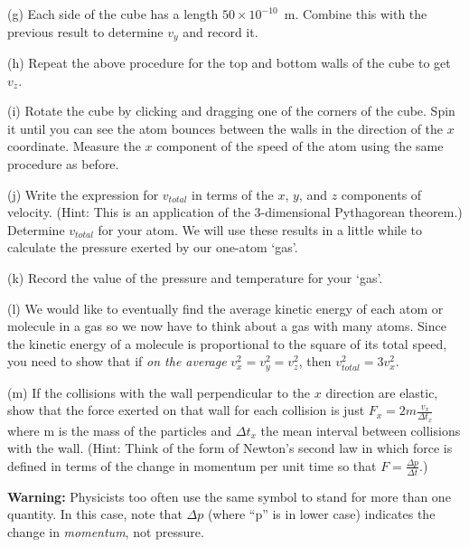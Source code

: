 (g) Each side of the cube has a length $50 \times 10^{-10}$~m.
Combine this with the previous result to determine $v_y$ and record it.
\vspace{20mm}

(h) Repeat the above procedure for the top and bottom walls of the cube to get $v_z$.
\vspace{20mm}

(i) Rotate the cube by clicking and dragging one of the corners of the cube.
Spin it until you can see the atom bounces between the walls in the direction of
the $x$ coordinate.
Measure the $x$ component of the speed of the atom using the same procedure as before.
\vspace{20mm}

(j) Write the
expression for \( v_{total} \) in terms of the $x$, $y$, and $z$ components
of velocity. (Hint: This is an application of the 3-dimensional Pythagorean
theorem.) Determine $v_{total}$ for your atom.
We will use these results in a little while to calculate the pressure exerted by
our one-atom `gas'.
\vspace{20mm}

(k) Record the value of the pressure and temperature for your `gas'.
\vspace{20mm}

(l) We would like to eventually find the average kinetic energy of each atom or molecule
in a gas so we now have to think about a gas with many atoms.
Since the kinetic energy of a molecule is proportional to the square
of its total speed, you need to show that if \emph{on the average}
\( v_{x}^{2}=v_{y}^{2}=v_{z}^{2} \), then \( v_{total}^{2}=3v_{x}^{2} \).
\vspace{20mm}

(m) If the collisions with the wall perpendicular to the $x$ direction
are elastic, show that the force exerted on that wall for each collision
is just \( F_{x}=2m\frac{v_{x}}{\Delta t_{x}} \)where m is the mass
of the particles and \( \Delta t_{x} \) the mean interval between
collisions with the wall. (Hint: Think of the form of Newton's second
law in which force is defined in terms of the change in momentum per
unit time so that \( F=\frac{\Delta p}{\Delta t} \).)

\textbf{Warning:} Physicists too often use the same symbol to stand
for more than one quantity. In this case, note that \( \Delta p \)
(where {}``p'' is in lower case) indicates the change in \emph{momentum},
not pressure.
\vspace{20mm}

